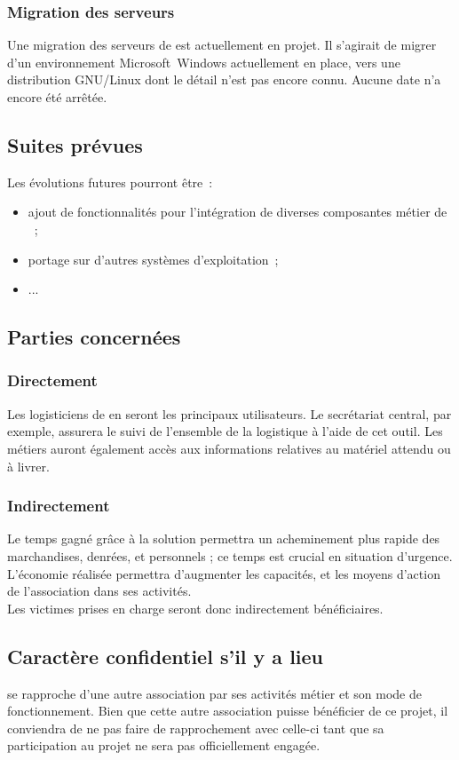 \subsubsection{Migration des serveurs}
Une migration des serveurs de \mo est actuellement en projet. Il s'agirait de migrer d'un environnement Microsoft~Windows actuellement en place, vers une distribution GNU/Linux dont le détail n'est pas encore connu. Aucune date n'a encore été arrêtée.

\subsection{Suites prévues}
Les évolutions futures pourront être~:
\begin{itemize}
	\item ajout de fonctionnalités pour l'intégration de diverses composantes métier de \mo~;
	\item portage sur d'autres systèmes d'exploitation~;
	\item ...
\end{itemize}

\subsection{Parties concernées}

\subsubsection{Directement}
Les logisticiens de \mo en seront les principaux utilisateurs. Le secrétariat central, par exemple, assurera le suivi de l'ensemble de la logistique à l'aide de cet outil.
Les métiers auront également accès aux informations relatives au matériel attendu ou à livrer.

\subsubsection{Indirectement}
Le temps gagné grâce à la solution permettra un acheminement plus rapide des marchandises, denrées, et personnels ; ce temps est crucial en situation d'urgence. L'économie réalisée permettra d'augmenter les capacités, et les moyens d'action de l'association dans ses activités.
\\
Les victimes prises en charge seront donc indirectement bénéficiaires.

\subsection{Caractère confidentiel s'il y a lieu}
\mo se rapproche d'une autre association par ses activités métier et son mode de fonctionnement. Bien que cette autre association puisse bénéficier de ce projet, il conviendra de ne pas faire de rapprochement avec celle-ci tant que sa participation au projet ne sera pas officiellement engagée.

